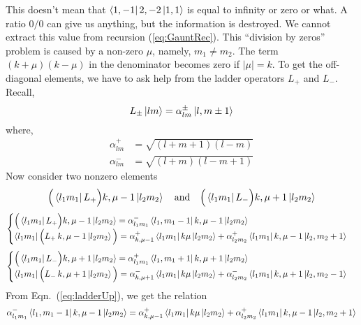 This doesn't mean that $\Bra{1,-1} 2,-2 \Ket{1,1}$ is equal to
infinity or zero or what. A ratio $0/0$ can give us anything, but the information
is destroyed. We cannot extract this value from recursion (\ref{eq:GauntRec}).
This ``division by zeros'' problem is caused by a non-zero $\mu$, namely, $m_1 \ne m_2$.
The term $(k+\mu)(k-\mu)$ in the denominator becomes zero if $|\mu|=k$.
To get the off-diagonal elements, we have to ask help from the ladder operators
$L_+$ and $L_-$. Recall,
\begin{equation} \label{eq:ladder}
L_\pm \Ket{lm} = \alpha_{lm}^\pm \Ket{l,m\pm1}
\end{equation}
where,
\begin{align}
\alpha_{lm}^+ & = \sqrt{(l+m+1)(l-m)} \label{eq:ldalphaUp} \\
\alpha_{lm}^- & = \sqrt{(l+m)(l-m+1)} \label{eq:ldalphaDn}
\end{align}
%
Now consider two nonzero elements
\begin{equation*}
\Big( \Bra{l_1m_1} L_+ \Big) k,\mu-1 \Ket{l_2m_2}
\quad \text{and} \quad
\Big( \Bra{l_1m_1} L_- \Big) k,\mu+1 \Ket{l_2m_2}
\end{equation*}
%
\begin{equation} \label{eq:ladderUp}
\begin{cases}
\Big( \Bra{l_1m_1} L_+ \Big) k,\mu-1 \Ket{l_2m_2} = \alpha_{l_1m_1}^- \Bra{l_1,m_1-1} k,\mu-1 \Ket{l_2m_2} \\
\Bra{l_1m_1} \Big( L_+\, k,\mu-1 \Ket{l_2m_2} \Big) = \alpha_{k,\mu-1}^+ \Bra{l_1m_1} k\mu \Ket{l_2m_2} + \alpha_{l_2m_2}^+ \Bra{l_1m_1} k,\mu-1 \Ket{l_2,m_2+1}
\end{cases}
\end{equation}
\begin{equation} \label{eq:ladderDn}
\begin{cases}
\Big( \Bra{l_1m_1} L_- \Big) k,\mu+1 \Ket{l_2m_2} = \alpha_{l_1m_1}^+ \Bra{l_1,m_1+1} k,\mu+1 \Ket{l_2m_2} \\
\Bra{l_1m_1} \Big( L_-\, k,\mu+1 \Ket{l_2m_2} \Big) = \alpha_{k,\mu+1}^- \Bra{l_1m_1} k\mu \Ket{l_2m_2} + \alpha_{l_2m_2}^- \Bra{l_1m_1} k,\mu+1 \Ket{l_2,m_2-1}
\end{cases}
\end{equation}
%
From Eqn.~(\ref{eq:ladderUp}), we get the relation
\begin{equation} \label{eq:ldUp}
\alpha_{l_1m_1}^- \Bra{l_1,m_1-1} k,\mu-1 \Ket{l_2m_2} =
\alpha_{k,\mu-1}^+ \Bra{l_1m_1} k\mu \Ket{l_2m_2} + \alpha_{l_2m_2}^+ \Bra{l_1m_1} k,\mu-1 \Ket{l_2,m_2+1}
\end{equation}
